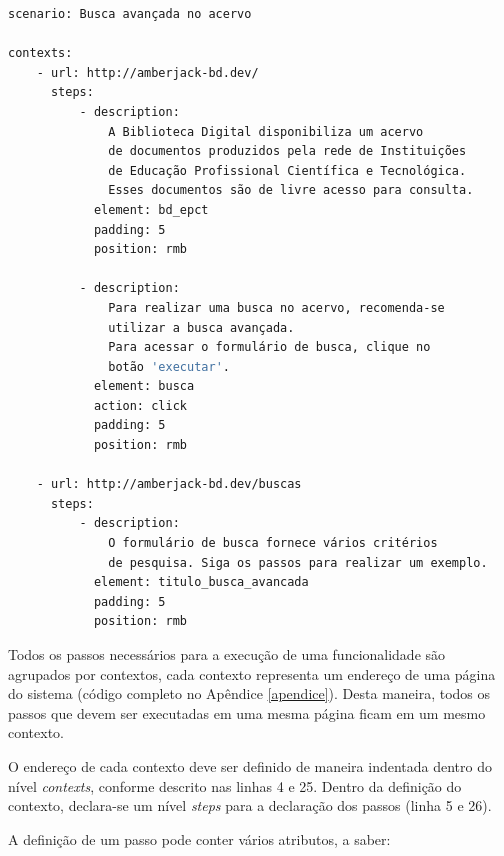 {\singlespace
\begin{lstlisting}[caption=Cenário descrito em YAML,language=Bash,label={lst:codigo_cenario_yaml}]
scenario: Busca avançada no acervo

contexts:
    - url: http://amberjack-bd.dev/
      steps:
          - description:
              A Biblioteca Digital disponibiliza um acervo
              de documentos produzidos pela rede de Instituições
              de Educação Profissional Científica e Tecnológica.
              Esses documentos são de livre acesso para consulta.
            element: bd_epct
            padding: 5
            position: rmb

          - description:
              Para realizar uma busca no acervo, recomenda-se
              utilizar a busca avançada.
              Para acessar o formulário de busca, clique no
              botão 'executar'.
            element: busca
            action: click
            padding: 5
            position: rmb

    - url: http://amberjack-bd.dev/buscas
      steps:
          - description:
              O formulário de busca fornece vários critérios
              de pesquisa. Siga os passos para realizar um exemplo.
            element: titulo_busca_avancada
            padding: 5
            position: rmb
\end{lstlisting}
}

Todos os passos necessários para a execução de uma funcionalidade são agrupados por contextos, cada contexto representa um endereço de uma página do sistema (código completo no Apêndice \ref{apendice}). Desta maneira, todos os passos que devem ser executadas em uma mesma página ficam em um mesmo contexto.

O endereço de cada contexto deve ser definido de maneira indentada dentro do nível \textit{contexts}, conforme descrito nas linhas 4 e 25. Dentro da definição do contexto, declara-se um nível \textit{steps} para a declaração dos passos (linha 5 e 26).

A definição de um passo pode conter vários atributos, a saber:

